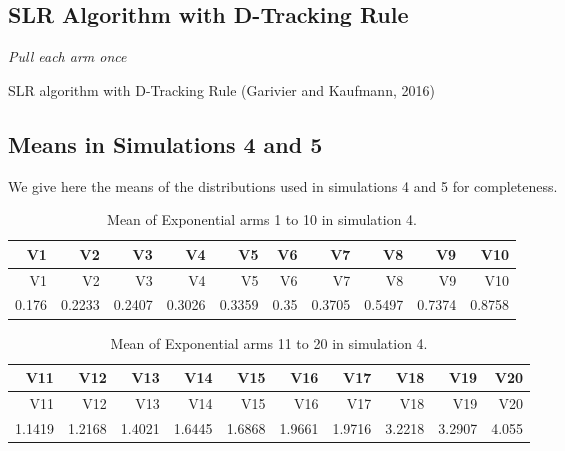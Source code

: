 \documentclass[11pt,]{article}
\begin{document}
\subsection{SLR Algorithm with D-Tracking
Rule}\label{slr-algorithm-with-d-tracking-rule}

\IncMargin{1em}

\begin{algorithm}
\BlankLine
\emph{Pull each arm once}\;
\caption{SLR algorithm with D-Tracking Rule (Garivier and Kaufmann, 2016)} \label{algo_slr_1d_dTracking}
\end{algorithm}

\DecMargin{1em}

\subsection{Means in Simulations 4 and
5}\label{means-in-simulations-4-and-5}

We give here the means of the distributions used in simulations 4 and 5
for completeness.

\begin{longtable}[]{@{}rrrrrrrrrr@{}}
\caption{Mean of Exponential arms 1 to 10 in simulation
4.}\tabularnewline
\toprule
V1 & V2 & V3 & V4 & V5 & V6 & V7 & V8 & V9 & V10\tabularnewline
\midrule
\endfirsthead
\toprule
V1 & V2 & V3 & V4 & V5 & V6 & V7 & V8 & V9 & V10\tabularnewline
\midrule
\endhead
0.176 & 0.2233 & 0.2407 & 0.3026 & 0.3359 & 0.35 & 0.3705 & 0.5497 &
0.7374 & 0.8758\tabularnewline
\bottomrule
\end{longtable}

\begin{longtable}[]{@{}rrrrrrrrrr@{}}
\caption{Mean of Exponential arms 11 to 20 in simulation
4.}\tabularnewline
\toprule
V11 & V12 & V13 & V14 & V15 & V16 & V17 & V18 & V19 & V20\tabularnewline
\midrule
\endfirsthead
\toprule
V11 & V12 & V13 & V14 & V15 & V16 & V17 & V18 & V19 & V20\tabularnewline
\midrule
\endhead
1.1419 & 1.2168 & 1.4021 & 1.6445 & 1.6868 & 1.9661 & 1.9716 & 3.2218 &
3.2907 & 4.055\tabularnewline
\bottomrule
\end{longtable}
\end{document}
